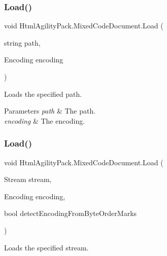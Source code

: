\subsubsection{\texorpdfstring{Load()}{Load()}\hspace{0.1cm}{\footnotesize\ttfamily [7/11]}}
{\footnotesize\ttfamily void Html\+Agility\+Pack.\+Mixed\+Code\+Document.\+Load (\begin{DoxyParamCaption}\item[{string}]{path,  }\item[{Encoding}]{encoding }\end{DoxyParamCaption})\hspace{0.3cm}{\ttfamily [inline]}}



Loads the specified path. 


\begin{DoxyParams}{Parameters}
{\em path} & The path.\\
\hline
{\em encoding} & The encoding.\\
\hline
\end{DoxyParams}
\mbox{\label{class_html_agility_pack_1_1_mixed_code_document_a52034e0257211603b51b4cb3fefe8150}} 
\subsubsection{\texorpdfstring{Load()}{Load()}\hspace{0.1cm}{\footnotesize\ttfamily [8/11]}}
{\footnotesize\ttfamily void Html\+Agility\+Pack.\+Mixed\+Code\+Document.\+Load (\begin{DoxyParamCaption}\item[{Stream}]{stream,  }\item[{Encoding}]{encoding,  }\item[{bool}]{detect\+Encoding\+From\+Byte\+Order\+Marks }\end{DoxyParamCaption})\hspace{0.3cm}{\ttfamily [inline]}}



Loads the specified stream. 


